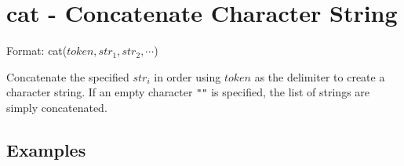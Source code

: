 
%

\section{cat - Concatenate Character String\label{sect:cat}}

Format: cat($token,str_1,str_2,\cdots$)

Concatenate the specified $str_i$ in order using $token$ as the delimiter to create a character string. If an empty character \verb|""| is specified, the list of strings are simply concatenated. 


\subsection*{Examples}


%

